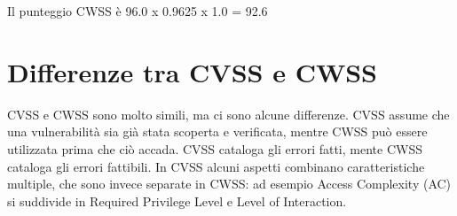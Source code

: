Il punteggio CWSS è 96.0 x 0.9625 x 1.0 = 92.6

\section{Differenze tra CVSS e CWSS}
CVSS e CWSS sono molto simili, ma ci sono alcune
differenze. CVSS assume che una vulnerabilità sia già stata scoperta e
verificata, mentre CWSS può essere utilizzata prima che ciò
accada. CVSS cataloga gli errori fatti, mente CWSS cataloga gli errori
fattibili. In CVSS alcuni aspetti combinano caratteristiche multiple,
che sono invece separate in CWSS: ad esempio Access Complexity (AC) si suddivide in Required
Privilege Level e Level of Interaction.



\let\cleardoublepage\clearpage